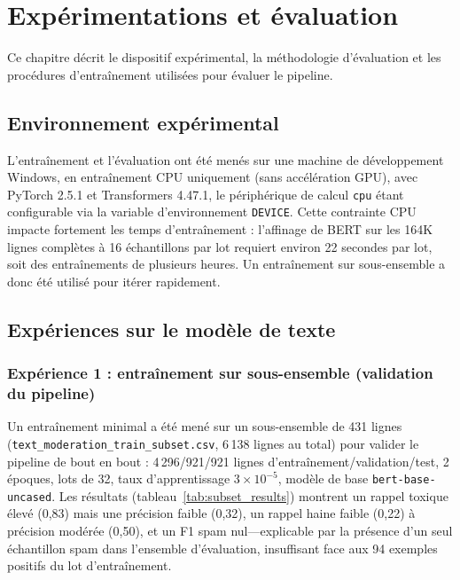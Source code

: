 \chapter{Expérimentations et évaluation}
\label{ch:experiments}

Ce chapitre décrit le dispositif expérimental, la méthodologie d'évaluation et les procédures d'entraînement utilisées pour évaluer le pipeline.

\section{Environnement expérimental}

L'entraînement et l'évaluation ont été menés sur une machine de développement Windows, en entraînement CPU uniquement (sans accélération GPU), avec PyTorch 2.5.1 et Transformers 4.47.1, le périphérique de calcul \texttt{cpu} étant configurable via la variable d'environnement \texttt{DEVICE}. Cette contrainte CPU impacte fortement les temps d'entraînement : l'affinage de BERT sur les 164K lignes complètes à 16 échantillons par lot requiert environ 22 secondes par lot, soit des entraînements de plusieurs heures. Un entraînement sur sous-ensemble a donc été utilisé pour itérer rapidement.

\section{Expériences sur le modèle de texte}

\subsection{Expérience 1 : entraînement sur sous-ensemble (validation du pipeline)}

Un entraînement minimal a été mené sur un sous-ensemble de 431 lignes (\texttt{text\_moderation\_train\_subset.csv}, 6\,138 lignes au total) pour valider le pipeline de bout en bout : 4\,296/921/921 lignes d'entraînement/validation/test, 2 époques, lots de 32, taux d'apprentissage $3 \times 10^{-5}$, modèle de base \texttt{bert-base-uncased}. Les résultats (tableau~\ref{tab:subset_results}) montrent un rappel toxique élevé (0,83) mais une précision faible (0,32), un rappel haine faible (0,22) à précision modérée (0,50), et un F1 spam nul---explicable par la présence d'un seul échantillon spam dans l'ensemble d'évaluation, insuffisant face aux 94 exemples positifs du lot d'entraînement.

